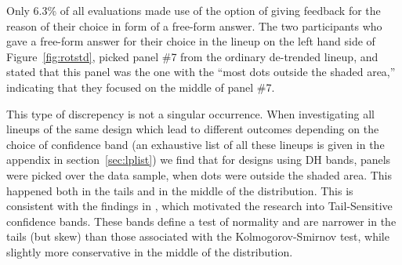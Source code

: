 \documentclass[12pt]{article}\usepackage[]{graphicx}\usepackage[]{color}
\begin{document}
\afterpage{\clearpage}
Only 6.3\% of all evaluations made use of the option of giving feedback for the reason of their choice in form of a free-form answer.
%
The two participants who gave a free-form answer for their choice in the lineup on the left hand side of Figure~\ref{fig:rotstd}, picked panel \#7 from the ordinary de-trended lineup, and stated that this panel was the one with the ``most dots outside the shaded area,'' indicating that they focused on the middle of panel \#7. 

This type of discrepency is not a singular occurrence. When investigating all lineups of the same design which lead to different outcomes depending on the choice of confidence band (an exhaustive list of all these lineups is given in the appendix in section~\ref{sec:lplist}) we find that for designs using DH bands, panels were picked over the data sample, when dots were outside the shaded area. This happened both in the tails and in the middle of the distribution.
This is consistent with the findings in \citet{buja:2013}, which motivated the research into Tail-Sensitive confidence bands. These bands define a test of normality and are narrower in the tails (but skew) than those associated with the Kolmogorov-Smirnov test, while slightly more conservative in the middle of the distribution.


\end{document}

